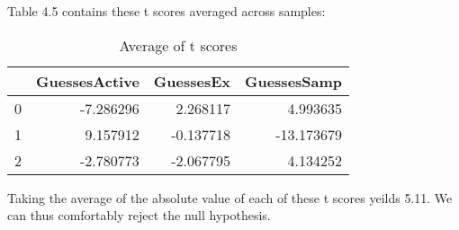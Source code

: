 Table 4.5 contains these t scores averaged across samples:

\begin{table}
\begin{tabular}{lrrr}
\toprule
{} &  GuessesActive &  GuessesEx &  GuessesSamp \\
\midrule
0 &      -7.286296 &   2.268117 &     4.993635 \\
1 &       9.157912 &  -0.137718 &   -13.173679 \\
2 &      -2.780773 &  -2.067795 &     4.134252 \\
\bottomrule
\end{tabular}
\caption{Average of t scores}
\end{table}

Taking the average of the absolute value of each of these t scores yeilds
5.11. We can thus comfortably reject the null hypothesis.
